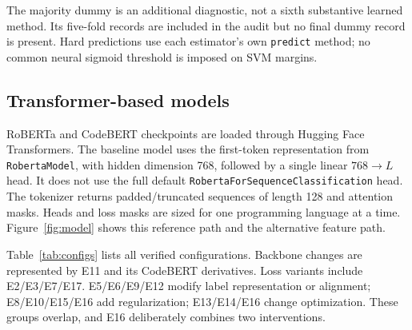 The majority dummy is an additional diagnostic, not a sixth substantive learned method. Its five-fold records are included in the audit but no final dummy record is present. Hard predictions use each estimator's own \texttt{predict} method; no common neural sigmoid threshold is imposed on SVM margins.

\subsection{Transformer-based models}
RoBERTa and CodeBERT checkpoints are loaded through Hugging Face Transformers. The baseline model uses the first-token representation from \texttt{RobertaModel}, with hidden dimension 768, followed by a single linear $768\rightarrow L$ head. It does not use the full default \texttt{RobertaForSequenceClassification} head. The tokenizer returns padded/truncated sequences of length 128 and attention masks. Heads and loss masks are sized for one programming language at a time. Figure~\ref{fig:model} shows this reference path and the alternative feature path.

Table~\ref{tab:configs} lists all verified configurations. Backbone changes are represented by E11 and its CodeBERT derivatives. Loss variants include E2/E3/E7/E17. E5/E6/E9/E12 modify label representation or alignment; E8/E10/E15/E16 add regularization; E13/E14/E16 change optimization. These groups overlap, and E16 deliberately combines two interventions.

